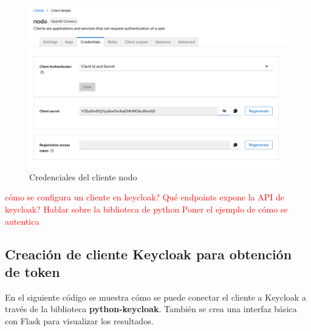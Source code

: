 \begin{figure}[H]
	\centering
	\includegraphics[width=0.9\linewidth]{Graphics/client_nodo_credentials}
	\caption{Credenciales del cliente nodo}
	\label{fig:clientnodocredentials}
\end{figure}

\textcolor{red} {cómo se configura un cliente en keycloak?
Qué endpoints expone la API de keycloak?
Hablar sobre la biblioteca de python
Poner el ejemplo de cómo se autentica}

\subsection*{Creación de cliente Keycloak para obtención de token}

En el siguiente código se muestra cómo se puede conectar el cliente a Keycloak a través de la biblioteca \textbf{python-keycloak}. También se crea una interfaz básica con Flask para visualizar los resultados.




